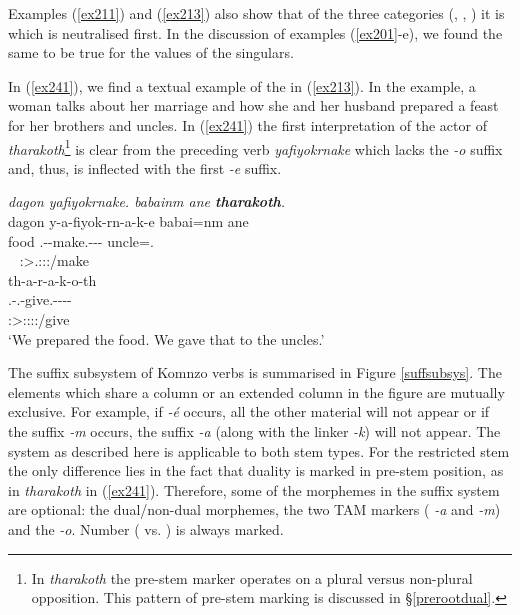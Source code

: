 Examples (\ref{ex211}) and (\ref{ex213}) also show that of the three categories (, , ) it is  which is neutralised first. In the discussion of examples (\ref{ex201}-e), we found the same to be true for the  values of the singulars.

In (\ref{ex241}), we find a textual example of the   in (\ref{ex213}). In the example, a woman talks about her marriage and how she and her husband prepared a feast for her brothers and uncles. In (\ref{ex241}) the first  interpretation of the actor of \emph{tharakoth}\footnote{In \emph{tharakoth} the pre-stem marker operates on a plural versus non-plural opposition. This pattern of pre-stem marking is discussed in {\S}\ref{prerootdual}.} is clear from the preceding verb \emph{yafiyokrnake} which lacks the  \emph{-o} suffix and, thus, is inflected with the first  \emph{-e} suffix.

\begin{exe}
	\ex \emph{dagon yafiyokrnake. babainm ane \textbf{tharakoth}.}\\
	\glll dagon y-a-fiyok-rn-a-k-e babai=nm ane\\
	food \Tsg.\Masc-\Vc-make.\Ext-\Pst-\Lk-{\Fnsg} uncle=\Dat.{\Nsg} {\Dem}\\
	~ {\footnotesize \Fdu:\Sbj>\Tsg.\Masc:\Obj:\Pst:\Ipfv/make} ~ ~\\
	\sn
	\glll th-a-r-a-k-o-th\\
	\Stnsg.\Gam-\Vc.\Du-give.\Rs-\Pst-\Lk-\Andat-\Nsg\\
	{\footnotesize \Du:\Sbj>\Stpl:\Io:\Pst:\Pfv:\Andat/give}\\
	\trans `We prepared the food. We gave that to the uncles.' 
	\label{ex241}
\end{exe}

The suffix subsystem of Komnzo verbs is summarised in Figure \ref{suffsubsys}. The elements which share a column or an extended column in the figure are mutually exclusive. For example, if \emph{-é} occurs, all the other material will not appear or if the  suffix \emph{-m} occurs, the  suffix \emph{-a} (along with the linker \emph{-k}) will not appear. The system as described here is applicable to both stem types. For the restricted stem the only difference lies in the fact that duality is marked in pre-stem position, as in \emph{tharakoth} in (\ref{ex241}). Therefore, some of the morphemes in the suffix system are optional: the dual/non-dual morphemes, the two TAM markers (\Pst{} \emph{-a} and \Dur{} \emph{-m}) and the  \emph{-o}. Number ({\Sg} vs. \Nsg) is always marked.


